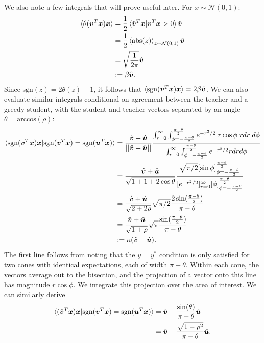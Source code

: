 \documentclass{article}
\renewcommand\b\bm
\begin{document}
We also note a few integrals that will prove useful later.
For $x \sim \mathcal{N}(0, 1)$:
\begin{align}
    \braket{\theta (\b{v}^T \b{x}) \b{x} } &= \frac{1}{2} \braket{ \hat{\b{v}}^T \b{x} | \b{v}^T \b{x} > 0 } \hat{\b{v}}\\
    &= \frac{1}{2} \braket{\text{abs}(z)}_{z \sim \mathcal{N}(0, 1)} \hat{\b{v}}\\
    &= \sqrt{\frac{1}{2 \pi}} \hat{\b{v}}\\
    &:= \beta \hat{\b{v}}.
\end{align}
Since $\text{sgn}(z) = 2 \theta(z) - 1$, it follows that $\braket{\text{sgn} (\b{v}^T \b{x}) \b{x} } = 2 \beta \tilde{\b{v}}$.
We can also evaluate similar integrals conditional on agreement between the teacher and a greedy student, with the student and teacher vectors separated by an angle $\theta = \text{arccos}(\rho)$:
\begin{align}
    \label{eq:conditonal_sgn}
    \braket{\text{sgn}(\b{v}^T \b{x}) \b{x} | \text{sgn}(\b{v}^T \b{x})= \text{sgn}(\b{u}^T \b{x})} &= \frac{\hat{\b{v}} + \hat{\b{u}}}{|| \hat{\b{v}} + \hat{\b{u}} || } \frac{\int_{r = 0}^{\infty} \int_{\phi = - \frac{\pi - \theta}{2}}^{\frac{\pi - \theta}{2}} e^{-r^2/2} \; r \cos \phi  \; r dr \; d \phi}{\int_{r = 0}^{\infty} \int_{\phi = - \frac{\pi - \theta}{2}}^{\frac{\pi - \theta}{2}} e^{-r^2/2} r dr d \phi} \\ 
    &= \frac{\hat{\b{v}} + \hat{\b{u}}}{ \sqrt{ 1 + 1 + 2 \cos \theta } } \frac{\sqrt{\pi / 2} [\sin \phi]_{\phi = - \frac{\pi - \theta}{2}}^{\frac{\pi - \theta}{2}} }{ [e^{-r^2/2}]_{r=0}^\infty [\phi]_{\phi = - \frac{\pi - \theta}{2}}^{\frac{\pi - \theta}{2}} }\\
    &= \frac{\hat{\b{v}} + \hat{\b{u}}}{ \sqrt{2 + 2 \rho} } \sqrt{\pi / 2} \frac{2 \sin (\frac{\pi - \theta}{2}) }{\pi - \theta}\\
    &= \frac{\hat{\b{v}} + \hat{\b{u}}}{ \sqrt{ 1 + \rho} } \sqrt{ \pi} \frac{\sin (\frac{\pi - \theta}{2}) }{\pi - \theta}\\
    &:= \kappa ( \hat{\b{v}} + \hat{\b{u}} ).
\end{align}
The first line follows from noting that the $y = y^*$ condition is only satisfied for two cones with identical expectations, each of width $\pi - \theta$.
Within each cone, the vectors average out to the bisection, and the projection of a vector onto this line has magnitude $r \cos \phi$.
We integrate this projection over the area of interest.
We can similarly derive
\begin{align}
    \label{eq:conditonal_lin}
    \braket{(\hat{\b{v}}^T \b{x}) \b{x} | \text{sgn}(\b{v}^T \b{x})= \text{sgn}(\b{u}^T \b{x})} &= \hat{\b{v}} + \frac{\sin (\theta) }{\pi - \theta} \hat{\b{u}}\\
    &= \hat{\b{v}} + \frac{ \sqrt{1-\rho^2} }{\pi - \theta} \hat{\b{u}}.
\end{align}
\end{document}
